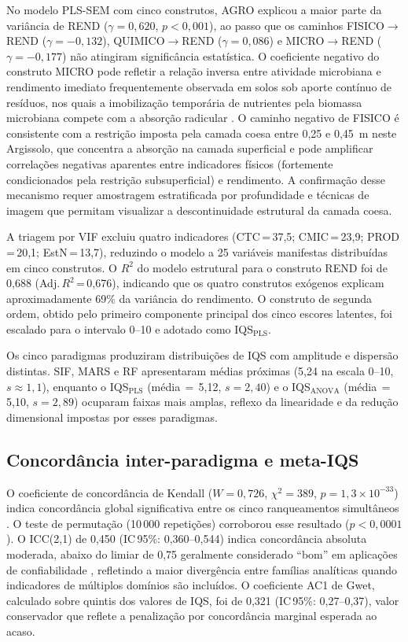 \documentclass[pdflatex,sn-basic]{sn-jnl}%
\begin{document}
No modelo PLS-SEM com cinco construtos, AGRO explicou a maior parte da variância de REND ($\gamma = 0{,}620$, $p < 0{,}001$), ao passo que os caminhos FISICO$\to$REND ($\gamma = -0{,}132$), QUIMICO$\to$REND ($\gamma = 0{,}086$) e MICRO$\to$REND ($\gamma = -0{,}177$) não atingiram significância estatística. O coeficiente negativo do construto MICRO pode refletir a relação inversa entre atividade microbiana e rendimento imediato frequentemente observada em solos sob aporte contínuo de resíduos, nos quais a imobilização temporária de nutrientes pela biomassa microbiana compete com a absorção radicular \citep{Cardoso2013}. O caminho negativo de FISICO é consistente com a restrição imposta pela camada coesa entre 0,25 e 0,45~m neste Argissolo, que concentra a absorção na camada superficial e pode amplificar correlações negativas aparentes entre indicadores físicos (fortemente condicionados pela restrição subsuperficial) e rendimento. A confirmação desse mecanismo requer amostragem estratificada por profundidade e técnicas de imagem que permitam visualizar a descontinuidade estrutural da camada coesa. 

A triagem por VIF excluiu quatro indicadores (CTC\,=\,37,5; CMIC\,=\,23,9; PROD\,=\,20,1; EstN\,=\,13,7), reduzindo o modelo a 25 variáveis manifestas distribuídas em cinco construtos. O $R^2$ do modelo estrutural para o construto REND foi de 0,688 (Adj.\,$R^2$\,=\,0,676), indicando que os quatro construtos exógenos explicam aproximadamente 69\% da variância do rendimento. O construto de segunda ordem, obtido pelo primeiro componente principal dos cinco escores latentes, foi escalado para o intervalo 0--10 e adotado como IQS$_{\text{PLS}}$.

Os cinco paradigmas produziram distribuições de IQS com amplitude e dispersão distintas. SIF, MARS e RF apresentaram médias próximas (5,24 na escala 0--10, $s \approx 1{,}1$), enquanto o IQS$_{\text{PLS}}$ (média\,$=$\,5,12, $s = 2{,}40$) e o IQS$_{\text{ANOVA}}$ (média\,$=$\,5,10, $s = 2{,}89$) ocuparam faixas mais amplas, reflexo da linearidade e da redução dimensional impostas por esses paradigmas.

\subsection{Concordância inter-paradigma e meta-IQS}\label{subsec:concordance_disc}

O coeficiente de concordância de Kendall ($W = 0{,}726$, $\chi^2 = 389$, $p = 1{,}3 \times 10^{-33}$) indica concordância global significativa entre os cinco ranqueamentos simultâneos \citep{Legendre2012}. O teste de permutação (10\,000 repetições) corroborou esse resultado ($p < 0{,}0001$). O ICC(2,1) de 0,450 (IC\,95\%: 0,360--0,544) indica concordância absoluta moderada, abaixo do limiar de 0,75 geralmente considerado ``bom'' em aplicações de confiabilidade \citep{Koo2016}, refletindo a maior divergência entre famílias analíticas quando indicadores de múltiplos domínios são incluídos. O coeficiente AC1 de Gwet, calculado sobre quintis dos valores de IQS, foi de 0,321 (IC\,95\%: 0,27--0,37), valor conservador que reflete a penalização por concordância marginal esperada ao acaso.
\end{document}

